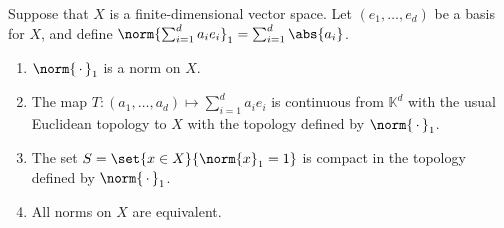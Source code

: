 \documentclass[article, a4paper, 11pt, oneside]{memoir}
\numberwithin{equation}{chapter}
\newcommand{\bbK}{\mathbb{K}}
\theoremstyle{nonumberplain}
\begin{document}
\begin{exerciseframed*}[6]
	Suppose that $X$ is a finite-dimensional vector space. Let $(e_1, \ldots, e_d)$ be a basis for $X$, and define $\norm{\sum_{i=1}^d a_i e_i}_1 = \sum_{i=1}^d \abs{a_i}$.
	\begin{enumerate}
		\item $\norm{\,\cdot\,}_1$ is a norm on $X$.
		\item The map $T \colon (a_1, \ldots, a_d) \mapsto \sum_{i=1}^d a_i e_i$ is continuous from $\bbK^d$ with the usual Euclidean topology to $X$ with the topology defined by $\norm{\,\cdot\,}_1$.
		\item The set $S = \set{x \in X}{\norm{x}_1 = 1}$ is compact in the topology defined by $\norm{\,\cdot\,}_1$.
		\item All norms on $X$ are equivalent.
	\end{enumerate}
\end{exerciseframed*}
\end{document}
